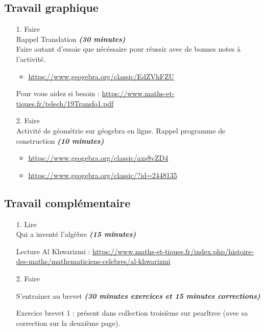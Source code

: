\documentclass[11pt]{article}
\newcommand{\tempsexo}[1]{\textit{\textbf{(#1)}}}
\begin{document}
\subsection{Travail graphique}

\begin{enumerate}
\item[1.] \huge{Faire} \\ \normalsize 
  Rappel Translation \tempsexo{30 minutes} \\
	Faire autant d'essaie que nécéssaire pour réussir avec de bonnes notes à l'activité.

	\begin{itemize} 
    \item \url{https://www.geogebra.org/classic/EdZVhFZU} 
  \end{itemize}
  
  Pour vous aidez si besoin : \url{https://www.maths-et-tiques.fr/telech/19Transfo1.pdf}



\item[2.] \huge{Faire} \\ \normalsize 
Activité de géométrie sur géogebra en ligne. Rappel programme de construction \tempsexo{10 minutes} 

	\begin{itemize} 
	  \item \url{https://www.geogebra.org/classic/axs8vZD4}
	  \item \url{https://www.geogebra.org/classic/?id=2448135}
  \end{itemize}

\end{enumerate}		
\subsection{Travail complémentaire}

\begin{enumerate}
\item[1.] \huge{Lire} \\ \normalsize 
  Qui a inventé l'algèbre \tempsexo{15 minutes}

	Lecture Al Khwarizmi : \url{https://www.maths-et-tiques.fr/index.php/histoire-des-maths/mathematiciens-celebres/al-khwarizmi}
	
\item[2.] \huge{Faire} \\ \normalsize 

  S'entrainer au brevet \tempsexo{30 minutes exercices et 15 minutes corrections}

	Exercice brevet 1 : présent dans  collection troisième sur pearltree (avec sa correction sur la deuxième page).
\end{enumerate}		
\end{document}
